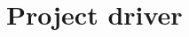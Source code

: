 \begin{comment}
				For this goal an USB-capable board equipped with an MSP430 microcontroller was chosen for acting
				as the receiver accessory. More specifically, this microcontroller would be running FreeRTOS
				(operating system oriented to tasks with real-time needs), which would be accordingly modified
				for dealing with the USB interface and 802.15.4 communication.\\
				It is also noteworthy that the usage of a prototyping board and a potential miniaturisation of
				the previously described board were included into the scope of this objective as well. Besides, 
				full description and more details about this development and 802.15.4 communication can be found 
				at \autoref{ch:hardware}, \nameref{ch:hardware}.\\
			\item \emph{Android ECG application}\\
				Finally, an Android application acts as the system's frontend. Its most relevant requirements were
				determined by the existing EPFL iOS application, with subtle modifications due to the different
				platform as well as the inclusion of an extra accessory.\\
				The data the application displays, in the shape of ECG waves, may be retrieved from a Bluetooth
				or 802.15.4 streaming node or a local log file. These logs are written by the application itself
				as it receives an incoming data transmission, so that it can replay them later --original
				iOS application lacked this feature--.\\
				Moreover, view controls shall also be offered for the user to modify display density, and move
				forwards and backwards if a log is being displayed.\\
				More information about the application, such as requirements and other details, can be found
				at \autoref{ch:swdev}, \nameref{ch:swdev}.\\
		\end{enumerate}
		\end{comment}
		
	\section{Project driver}
		
